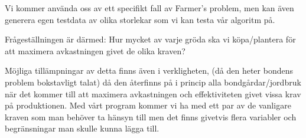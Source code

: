 \documentclass{article}
\begin{document}
Vi kommer använda oss av ett specifikt fall av Farmer’s problem, men kan även generera egen testdata av olika storlekar som vi kan testa vår algoritm på. 

Frågeställningen är därmed: Hur mycket av varje gröda ska vi köpa/plantera för att maximera avkastningen givet de olika kraven?

Möjliga tillämpningar av detta finns även i verkligheten, (då den heter bondens problem bokstavligt talat) då den återfinns på i princip alla bondgårdar/jordbruk när det kommer till att maximera avkastningen och effektiviteten givet vissa krav på produktionen. Med vårt program kommer vi ha med ett par av de vanligare kraven som man behöver ta hänsyn till men det finns givetvis flera variabler och begränsningar man skulle kunna lägga till.
\end{document}
